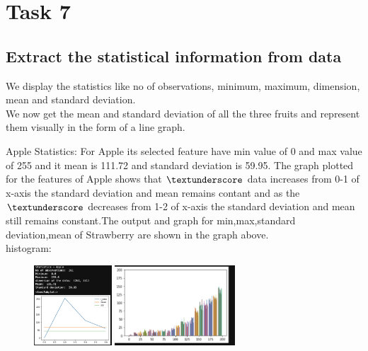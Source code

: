 \documentclass[conference]{IEEEtran}
\begin{document}
\section{Task 7}
\subsection{Extract the statistical information from data}
We display the statistics like no of observations, minimum, maximum, dimension, mean and standard deviation. \\
We now get the mean and standard deviation of all the three fruits and represent them visually in the form of a line graph.

Apple Statistics: 
For Apple its selected feature have min value of 0 and max value of 255 and it mean is 111.72 and standard deviation is 59.95. The graph plotted for the features of Apple shows that $\textunderscore$ data increases from 0-1 of x-axis the standard deviation and mean remains contant and as the $\textunderscore$ decreases from 1-2 of x-axis the standard deviation and mean still remains constant.The output and graph for min,max,standard deviation,mean of Strawberry are shown in the graph above. \\
histogram: \\
\begin{figure}[!htbp]
    \centering
    \includegraphics[height=3cm]{Task7_Apple.png} 
    \includegraphics[height=3cm]{Task2.35.png} 
    \label{fig:my_label}
\end{figure}
\end{document}
